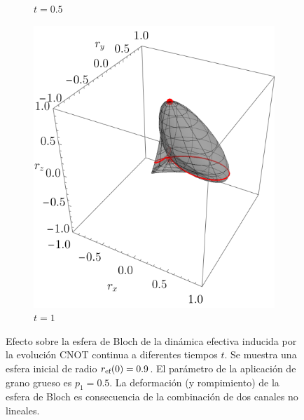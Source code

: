 \begin{figure}[ht!]
\begin{subfigure}{0.32\textwidth}
        \caption{$t=0.5$}
      \end{subfigure}
      \begin{subfigure}{0.32\textwidth}
        \centering
        \includegraphics[width=0.9\linewidth]{chapter4/figures_toy/CNOT_p=0.5_t=1._r=0.9.png}
        \caption{$t=1$}
      \end{subfigure}
      \caption{Efecto sobre la esfera de Bloch de la dinámica efectiva inducida por la evolución CNOT continua a diferentes tiempos $t$. Se muestra una esfera inicial de radio $r_{\text{ef}}(0)=0.9$. El parámetro de la aplicación de grano grueso es $p_{1}=0.5$. La deformación (y rompimiento) de la esfera de Bloch es consecuencia de la combinación de dos canales no lineales. \label{fig:CNOTSequence}}
      \end{figure}
      \newpage




      